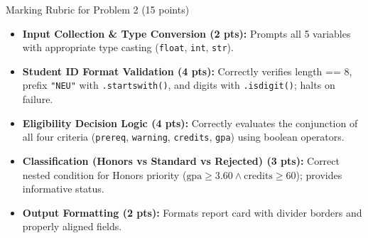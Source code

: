 \documentclass[11pt,a4paper]{article}
\begin{document}
\vspace{0.15cm}
\begin{solbox}{Marking Rubric for Problem 2 (15 points)}
\begin{itemize}[leftmargin=2em, itemsep=1pt]
  \item \textbf{Input Collection \& Type Conversion (2 pts):} Prompts all 5 variables with appropriate type casting (\texttt{float}, \texttt{int}, \texttt{str}).
  \item \textbf{Student ID Format Validation (4 pts):} Correctly verifies length == 8, prefix \texttt{"NEU"} with \texttt{.startswith()}, and digits with \texttt{.isdigit()}; halts on failure.
  \item \textbf{Eligibility Decision Logic (4 pts):} Correctly evaluates the conjunction of all four criteria (\texttt{prereq}, \texttt{warning}, \texttt{credits}, \texttt{gpa}) using boolean operators.
  \item \textbf{Classification (Honors vs Standard vs Rejected) (3 pts):} Correct nested condition for Honors priority ($\text{gpa} \ge 3.60 \land \text{credits} \ge 60$); provides informative status.
  \item \textbf{Output Formatting (2 pts):} Formats report card with divider borders and properly aligned fields.
\end{itemize}
\end{solbox}
\end{document}
